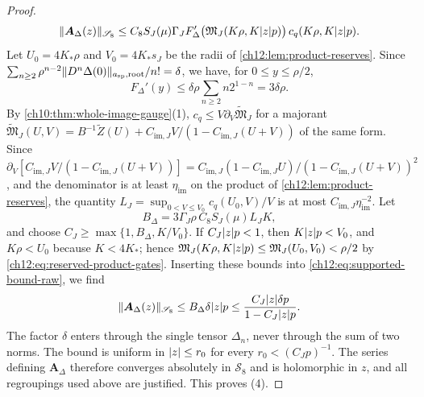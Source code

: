 \begin{proof}
\begin{equation}\label{ch12:eq:supported-bound-raw}
 \lVert \boldsymbol A_\Delta(z)\rVert_{\mathscr S_8}
 \le C_8S_J(\mu)\Gamma_JF_\Delta'\bigl(\mathfrak M_J(K\rho,K\lvert z\rvert p)\bigr)\,c_q(K\rho,K\lvert z\rvert p).
\end{equation}
Let $U_0=4K_*\rho$ and $V_0=4K_*s_J$ be the radii of \cref{ch12:lem:product-reserves}. Since $\sum_{n\ge2}\rho^{n-2}\lVert D^n\Delta(0)\rVert_{a_{\mathrm{sp}},\mathrm{root}}/n!=\delta$, we have, for $0\le y\le\rho/2$,
\[
 F_\Delta'(y)\le\delta\rho\sum_{n\ge2}n2^{1-n}=3\delta\rho .
\]
By \cref{ch10:thm:whole-image-gauge}(1), $c_q\le V\partial_V\widetilde{\mathfrak M}_J$ for a majorant $\widetilde{\mathfrak M}_J(U,V)=B^{-1}\widetilde Z(U)+C_{\mathrm{im},J}V/(1-C_{\mathrm{im},J}(U+V))$ of the same form. Since $\partial_V[C_{\mathrm{im},J}V/(1-C_{\mathrm{im},J}(U+V))]=C_{\mathrm{im},J}(1-C_{\mathrm{im},J}U)/(1-C_{\mathrm{im},J}(U+V))^2$, and the denominator is at least $\eta_{\mathrm{im}}$ on the product of \cref{ch12:lem:product-reserves}, the quantity $L_J=\sup_{0<V\le V_0}c_q(U_0,V)/V$ is at most $C_{\mathrm{im},J}\eta_{\mathrm{im}}^{-2}$. Let
\[
 B_\Delta=3\Gamma_J\rho\,C_8S_J(\mu)L_JK,
\]
and choose $C_J\ge\max\{1,B_\Delta,K/V_0\}$. If $C_J\lvert z\rvert p<1$, then $K\lvert z\rvert p<V_0$, and $K\rho<U_0$ because $K<4K_*$; hence $\mathfrak M_J(K\rho,K\lvert z\rvert p)\le\mathfrak M_J(U_0,V_0)<\rho/2$ by \eqref{ch12:eq:reserved-product-gates}. Inserting these bounds into \eqref{ch12:eq:supported-bound-raw}, we find
\[
 \lVert \boldsymbol A_\Delta(z)\rVert_{\mathscr S_8}\le B_\Delta\delta\lvert z\rvert p\le\frac{C_J\lvert z\rvert\delta p}{1-C_J\lvert z\rvert p}.
\]
The factor $\delta$ enters through the single tensor $\Delta_n$, never through the sum of two norms. The bound is uniform in $\lvert z\rvert\le r_0$ for every $r_0<(C_Jp)^{-1}$. The series defining $\boldsymbol A_\Delta$ therefore converges absolutely in $\mathscr S_8$ and is holomorphic in $z$, and all regroupings used above are justified. This proves (4).
\end{proof}

